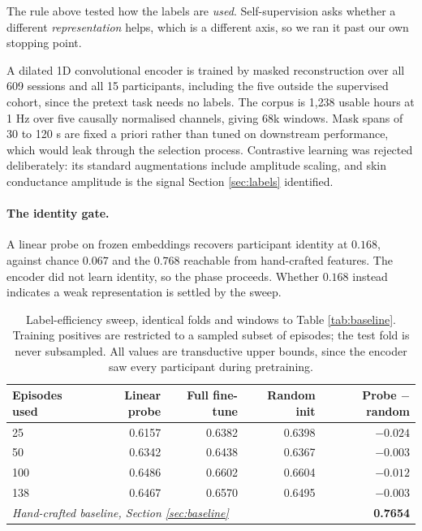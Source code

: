 The rule above tested how the labels are \emph{used}. Self-supervision asks
whether a different \emph{representation} helps, which is a different axis, so
we ran it past our own stopping point.

A dilated 1D convolutional encoder is trained by masked reconstruction over all
609 sessions and all 15 participants, including the five outside the supervised
cohort, since the pretext task needs no labels. The corpus is 1{,}238 usable
hours at 1 Hz over five causally normalised channels, giving 68k windows. Mask
spans of 30 to 120 s are fixed a priori rather than tuned on downstream
performance, which would leak through the selection process. Contrastive
learning was rejected deliberately: its standard augmentations include
amplitude scaling, and skin conductance amplitude is the signal Section
\ref{sec:labels} identified.

\paragraph{The identity gate.} A linear probe on frozen embeddings recovers
participant identity at $0.168$, against chance $0.067$ and the $0.768$
reachable from hand-crafted features. The encoder did not learn identity, so
the phase proceeds. Whether $0.168$ instead indicates a weak representation is
settled by the sweep.

\begin{table}[t]
\caption{Label-efficiency sweep, identical folds and windows to Table
\ref{tab:baseline}. Training positives are restricted to a sampled subset of
episodes; the test fold is never subsampled. All values are transductive upper
bounds, since the encoder saw every participant during pretraining.}
\label{tab:ssl}
\centering
\begin{tabular}{lrrrr}
\toprule
Episodes used & Linear probe & Full fine-tune & Random init & Probe $-$ random \\
\midrule
25  & 0.6157 & 0.6382 & 0.6398 & $-0.024$ \\
50  & 0.6342 & 0.6438 & 0.6367 & $-0.003$ \\
100 & 0.6486 & 0.6602 & 0.6604 & $-0.012$ \\
138 & 0.6467 & 0.6570 & 0.6495 & $-0.003$ \\
\midrule
\multicolumn{4}{l}{\emph{Hand-crafted baseline, Section \ref{sec:baseline}}}
  & \textbf{0.7654} \\
\bottomrule
\end{tabular}
\end{table}

